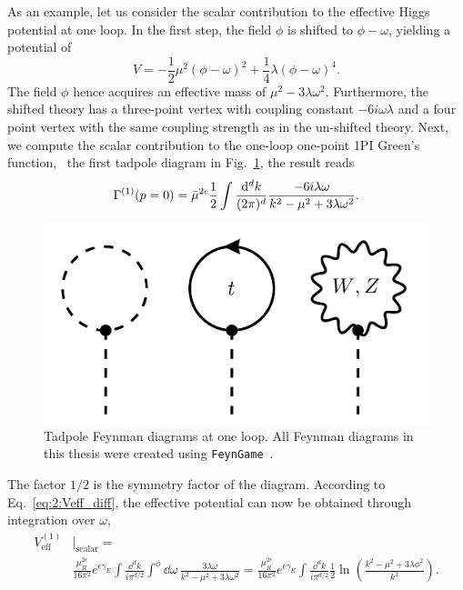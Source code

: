 As an example, let us consider the scalar contribution to the effective Higgs potential at one loop. In the first step, the field $\phi$ is shifted to $\phi - \omega$, yielding a potential of
\begin{equation}
V = -\frac{1}{2} \mu^2 (\phi - \omega)^2 + \frac{1}{4} \lambda (\phi - \omega)^4.
\end{equation}
The field $\phi$ hence acquires an effective mass of $\mu^2 - 3 \lambda \omega^2$. Furthermore, the shifted theory has a three-point vertex with coupling constant $- 6i\omega \lambda$ and a four point vertex with the same coupling strength as in the un-shifted theory. Next, we compute the scalar contribution to the one-loop one-point \acs{1PI} Green's function, \ie\ the first tadpole diagram in Fig.~\ref{fig:2:tadpoles}, the result reads
\begin{equation}
\Gamma^{(1)} (p = 0) = \bar{\mu}^{2 \epsilon} \frac{1}{2} \int \frac{\mathrm{d}^d k}{(2 \pi)^d} \frac{-6i \lambda \omega}{k^2 - \mu^2 + 3 \lambda \omega^2}.
\end{equation}
\begin{figure}[h]
\centering
\includegraphics[scale=0.25]{Images/tadpoles.pdf}
\caption{Tadpole Feynman diagrams at one loop. All Feynman diagrams in this thesis were created using \texttt{FeynGame}~\cite{Harlander:2020cyh, Harlander:2024qbn, Bundgen:2025utt}.}
\label{fig:2:tadpoles}
\end{figure}
The factor $1/2$ is the symmetry factor of the diagram. According to Eq.~\eqref{eq:2:Veff_diff}, the effective potential can now be obtained through integration over $\omega$,
\begin{equation}
\begin{split}
V_\text{eff}^{(1)} &\big \vert_{\text{scalar}} =  \\
&\frac{\mu_R^{2 \epsilon}}{16 \pi^2} e^{\epsilon \gamma_E} \int \frac{\dd^d k}{i \pi^{d/2}} \int^{\phi} \dd \omega\, \frac{3 \lambda \omega}{k^2 - \mu^2 + 3 \lambda \omega^2} = \frac{\mu_R^{2 \epsilon}}{16 \pi^2} e^{\epsilon \gamma_E} \int \frac{\dd^d k}{i \pi^{d/2}} \frac{1}{2} \ln\! \left( \frac{k^2 - \mu^2 + 3 \lambda \phi^2}{k^2} \right).
\end{split}
\end{equation}
